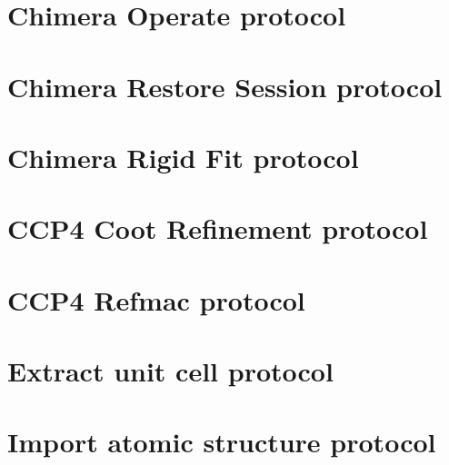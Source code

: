 \documentclass[12pt]{article} %
\begin{document}
\tableofcontents %

\newpage %






















\begin{appendices}


\section{Chimera Operate protocol}
\label{app:chimeraOperate}

\section{Chimera Restore Session protocol}
\label{app:chimeraRestoreSession}

\section{Chimera Rigid Fit protocol}
\label{app:chimeraRigidFit}

\section{CCP4 Coot Refinement protocol}
\label{app:ccp4CootRefinement}

\section{CCP4 Refmac protocol}
\label{app:ccp4Refmac}

\section{Extract unit cell protocol}
\label{app:extractUnitCell}

\section{Import atomic structure protocol}
\label{app:importAtomicStructure}


\end{appendices}
\end{document}
